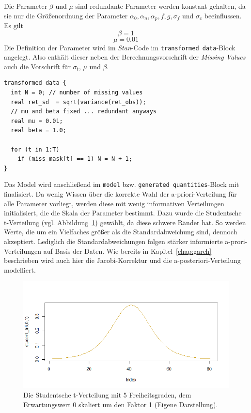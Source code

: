 \documentclass[ngerman]{ttlab-qualify}
\begin{document}
Die Parameter $\beta$ und $\mu$ sind redundante Parameter werden konstant gehalten, da sie nur die Größenordnung der Parameter $\alpha_0,\alpha_n,\alpha_p, f, g, \sigma_f$ und $\sigma_c$ beeinflussen. \\
Es gilt
\[\beta = 1\]
\[\mu = 0.01\]
Die Definition der Parameter wird im \textit{Stan}-Code im \verb|transformed data|-Block angelegt. Also enthält dieser neben der Berechnungsvorschrift der \textit{Missing Values} auch die Vorschrift für $\sigma_t$, $\mu$ und $\beta$.
\begin{lstlisting}[style=custom]
transformed data {
  int N = 0; // number of missing values
  real ret_sd  = sqrt(variance(ret_obs));
  // mu and beta fixed ... redundant anyways
  real mu = 0.01;
  real beta = 1.0;

  for (t in 1:T)
    if (miss_mask[t] == 1) N = N + 1;
}
\end{lstlisting}
Das Model wird anschließend im \verb|model| bzw. \verb|generated quantities|-Block mit finalisiert. Da wenig Wissen über die korrekte Wahl der a-priori-Verteilung für alle Parameter vorliegt, werden diese mit wenig informativen Verteilungen initialisiert, die die Skala der Parameter bestimmt. Dazu wurde die Studentsche t-Verteilung (vgl. Abbildung~\ref{fig:student-t}) gewählt, da diese schwere Ränder hat. So werden Werte, die um ein Vielfaches größer als die Standardabweichung sind, dennoch akzeptiert. Lediglich die Standardabweichungen folgen stärker informierte a-prori-Verteilungen auf Basis der Daten. Wie bereits in Kapitel~\ref{chap:garch} beschrieben wird auch hier die Jacobi-Korrektur und die a-posteriori-Verteilung modelliert. 

\begin{figure}[H]
\begin{center}
\includegraphics[scale=.5]{images/student_t}
\caption{Die Studentsche t-Verteilung mit 5 Freiheitsgraden, dem Erwartungswert 0 skaliert um den Faktor 1 (Eigene Darstellung).}
\label{fig:student-t}
\end{center}
\end{figure}
\end{document}
